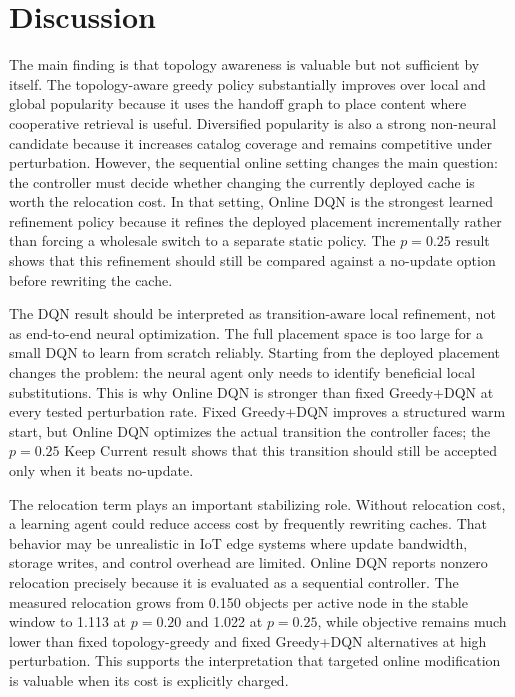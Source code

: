 \section{Discussion}

The main finding is that topology awareness is valuable but not sufficient by itself. The topology-aware greedy policy substantially improves over local and global popularity because it uses the handoff graph to place content where cooperative retrieval is useful. Diversified popularity is also a strong non-neural candidate because it increases catalog coverage and remains competitive under perturbation. However, the sequential online setting changes the main question: the controller must decide whether changing the currently deployed cache is worth the relocation cost. In that setting, Online DQN is the strongest learned refinement policy because it refines the deployed placement incrementally rather than forcing a wholesale switch to a separate static policy. The \(p=0.25\) result shows that this refinement should still be compared against a no-update option before rewriting the cache.

The DQN result should be interpreted as transition-aware local refinement, not as end-to-end neural optimization. The full placement space is too large for a small DQN to learn from scratch reliably. Starting from the deployed placement changes the problem: the neural agent only needs to identify beneficial local substitutions. This is why Online DQN is stronger than fixed Greedy+DQN at every tested perturbation rate. Fixed Greedy+DQN improves a structured warm start, but Online DQN optimizes the actual transition the controller faces; the \(p=0.25\) Keep Current result shows that this transition should still be accepted only when it beats no-update.

The relocation term plays an important stabilizing role. Without relocation cost, a learning agent could reduce access cost by frequently rewriting caches. That behavior may be unrealistic in IoT edge systems where update bandwidth, storage writes, and control overhead are limited. Online DQN reports nonzero relocation precisely because it is evaluated as a sequential controller. The measured relocation grows from 0.150 objects per active node in the stable window to 1.113 at \(p=0.20\) and 1.022 at \(p=0.25\), while objective remains much lower than fixed topology-greedy and fixed Greedy+DQN alternatives at high perturbation. This supports the interpretation that targeted online modification is valuable when its cost is explicitly charged.

